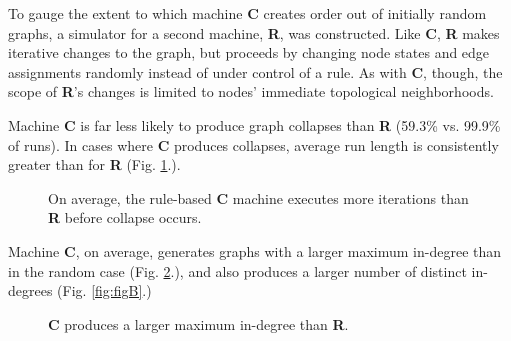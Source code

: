 \documentclass[twoside,twocolumn]{article}
\begin{document}
To gauge the extent to which machine \textbf{C} creates order out of
initially random graphs, a simulator for a second machine, \textbf{R},
was constructed. Like \textbf{C}, \textbf{R} makes iterative changes to the
graph, but proceeds by changing node states and edge assignments randomly
instead of under control of a rule. As with \textbf{C}, though, the scope
of \textbf{R}'s changes is limited to nodes' immediate topological neighborhoods.

Machine \textbf{C} is far less likely to produce graph collapses than
\textbf{R} (59.3\% vs. 99.9\% of runs). In cases where \textbf{C} produces
collapses, average run length is consistently greater than
for \textbf{R} (Fig. \ref{fig:figA}.).

\begin{figure}
  \caption{On average, the rule-based \textbf{C} machine executes more iterations than \textbf{R}  before collapse occurs.}
  \label{fig:figA}
\end{figure}

Machine \textbf{C}, on average, generates graphs with a larger 
maximum in-degree than in the random case (Fig. \ref{fig:figC}.), and also produces a
larger number of distinct in-degrees (Fig. \ref{fig:figB}.)

\begin{figure}
  \caption{\textbf{C} produces a larger maximum in-degree than \textbf{R}.}
  \label{fig:figC}
\end{figure}
\end{document}
